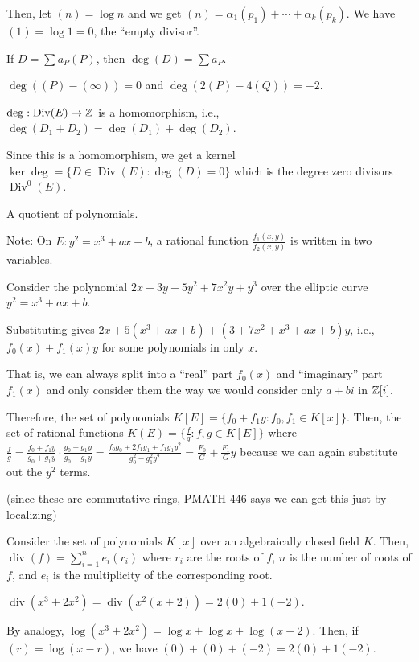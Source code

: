 \documentclass[notes]{agony}
\begin{document}
Then, let $(n) = \log n$ and we get $(n) = \alpha_1 (p_1) + \dotsb + \alpha_k (p_k)$.
We have $(1) = \log 1 = 0$, the ``empty divisor''.

\begin{defn}[degree]
  If $D = \sum a_P(P)$, then $\deg(D) = \sum a_P$.
\end{defn}
\begin{example}
  $\deg((P) - (\infty)) = 0$ and $\deg(2(P) - 4(Q)) = -2$.
\end{example}

\newcommand{\Div}{\operatorname{Div}}
\begin{prop}
  $\deg : \Div(E) \to \Z$ is a homomorphism, i.e.,
  $\deg(D_1 + D_2) = \deg(D_1) + \deg(D_2)$.
\end{prop}

Since this is a homomorphism, we get a kernel
$\ker \deg = \{ D \in \Div(E) : \deg(D) = 0 \}$
which is the degree zero divisors $\Div^0(E)$.

\begin{defn}
  A quotient of polynomials.
\end{defn}

Note: On $E : y^2 = x^3 + ax + b$, a rational function
$\frac{f_1(x,y)}{f_2(x,y)}$ is written in two variables.

\begin{example}
  Consider the polynomial $2x + 3y + 5y^2 + 7x^2y + y^3$
  over the elliptic curve $y^2 = x^3 + ax + b$.

  Substituting gives $2x + 5(x^3 + ax + b) + (3 + 7x^2 + x^3 + ax + b)y$,
  i.e., $f_0(x) + f_1(x)y$ for some polynomials in only $x$.
\end{example}

That is, we can always split into a ``real'' part $f_0(x)$ and ``imaginary'' part $f_1(x)$
and only consider them the way we would consider only $a + bi$ in $\mathbb{Z}[i]$.

Therefore, the set of polynomials $K[E] = \{f_0 + f_1 y : f_0,f_1 \in K[x]\}$.
Then, the set of rational functions $K(E) = \{\frac{f}{g} : f,g \in K[E]\}$
where $\frac{f}{g} = \frac{f_0+f_1y}{g_0+g_1y}\cdot\frac{g_0-g_1y}{g_0-g_1y}
  = \frac{f_0g_0 + 2f_1g_1 + f_1g_1 y^2}{g_0^2-g_1^2y^2} = \frac{F_0}{G} + \frac{F_1}{G}y$
because we can again substitute out the $y^2$ terms.

(since these are commutative rings, PMATH 446 says we can get this just by localizing)

\renewcommand{\div}{\operatorname{div}}
\begin{defn}
  Consider the set of polynomials $K[x]$ over an algebraically closed field $K$.
  Then, $\div(f) = \sum_{i=1}^n e_i(r_i)$ where $r_i$ are the roots of $f$,
  $n$ is the number of roots of $f$, and $e_i$ is the multiplicity of the corresponding root.
\end{defn}
\begin{example}
  $\div(x^3 + 2x^2) = \div(x^2(x+2)) = 2(0) + 1(-2)$.

  By analogy, $\log(x^3 + 2x^2) = \log x + \log x + \log(x+2)$.
  Then, if $(r) = \log(x-r)$, we have $(0) + (0) + (-2) = 2(0) + 1(-2)$.
\end{example}
\end{document}
